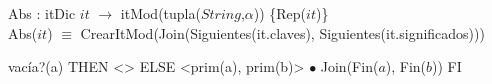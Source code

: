 Abs : itDic $it$ $\longrightarrow$ itMod(tupla($String$,$\alpha$)) \hfill\{Rep($it$)\}\\ \hspace*{4mm}
Abs($it$) $\equiv$ CrearItMod(Join(Siguientes(it.claves), Siguientes(it.significados)))

	{\IF vacía?(a) THEN 
		<>
	ELSE 
		<prim(a), prim(b)> $\bullet$ Join(Fin($a$), Fin($b$))
	FI}


